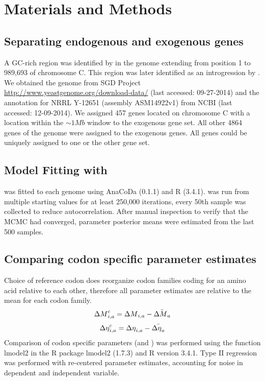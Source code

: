 \section{Materials and Methods}

\subsection{Separating endogenous and exogenous genes}
A GC-rich region was identified by \citet{payen2009} in the \kluyveri genome extending from position 1 to 989,693 of chromosome C.
This region was later identified as an introgression by \citet{friedrich2015}.
We obtained the \kluyveri genome from SGD Project \url{http://www.yeastgenome.org/download-data/} (last accessed: 09-27-2014) and the annotation for \kluyveri NRRL Y-12651 (assembly ASM14922v1) from NCBI (last accessed: 12-09-2014).
We assigned 457 genes located on chromosome C with a location within the $\sim 1 Mb$ window to the exogenous gene set.
All other 4864 genes of the \kluyveri genome were assigned to the exogenous genes.
All genes could be uniquely assigned to one or the other gene set.

\subsection{Model Fitting with \ROC}
\ROC was fitted to each genome using AnaCoDa (0.1.1) \citep{landerer2018} and R (3.4.1).
\ROC was run from multiple starting values for at least 250,000 iterations, every 50th sample was collected to reduce autocorrelation. 
After manual inspection to verify that the MCMC had converged, parameter posterior means were estimated from the last 500 samples.

\subsection{Comparing codon specific parameter estimates}
Choice of reference codon does reorganize codon families coding for an amino acid relative to each other, therefore all parameter estimates are relative to the mean for each codon family.
\begin{equation}
{\Delta M}_{i,a}^c = {\Delta M}_{i,a} - \bar{{\Delta M}_a}
\end{equation}
\begin{equation}
{\Delta \eta}_{i,a}^c = {\Delta \eta}_{i,a} - \bar{{\Delta \eta}_a}
\end{equation}
Comparison of codon specific parameters (\DM and \DE) was performed using the function lmodel2 in the R package lmodel2 (1.7.3) and R version 3.4.1.
Type II regression was performed with re-centered parameter estimates, accounting for noise in dependent and independent variable.



